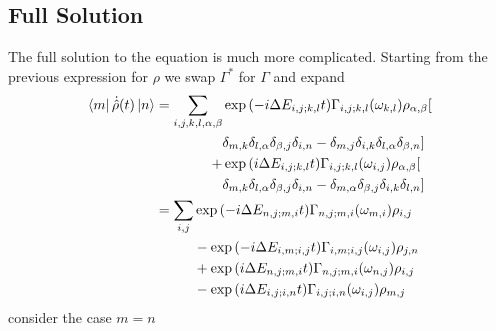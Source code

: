 \subsection{Full Solution}\label{sec:redfield equation full solution}
The full solution to the equation is
much more complicated. Starting from the
previous expression for \(\rho \) we
swap \(\Gamma^*\) for \(\Gamma \) and expand
\begin{align}
    \bra{m}\dot{\hat{\rho}}(t) \ket{n} & = \begin{aligned}[t]
        \sum_{i,j,k, l, \alpha, \beta} &
        \exp{(-i\Delta{}E_{i,j;k,l}t)}
        \Gamma_{i,j;k, l}(\omega_{k,l})
        \rho_{\alpha, \beta} [               \\ &
            \delta_{m, k}\delta_{l, \alpha}
            \delta_{\beta, j}\delta_{i, n}
            -\delta_{m, j}\delta_{i, k}
        \delta_{l, \alpha}\delta_{\beta, n}] \\
        +                              &
        \exp{(i\Delta{}E_{i,j;k,l} t)}
        \Gamma_{i,j; k, l}(\omega_{i,j})
        \rho_{\alpha, \beta} [               \\ &
            \delta_{m, k}\delta_{l, \alpha}
            \delta_{\beta, j}\delta_{i, n}
            - \delta_{m, \alpha}\delta_{\beta, j}
            \delta_{i, k}\delta_{l, n}]
    \end{aligned}                                   \\
                                       & = \begin{aligned}[t]
        \sum_{i,j} &
        \exp{(-i\Delta{}E_{n,j;m,i} t)}
        \Gamma_{n,j;m, i}(\omega_{m,i})
        \rho_{i,j}   \\
                   &
        -\exp{(-i\Delta{}E_{i,m;i,j} t)}
        \Gamma_{i,m;i, j}(\omega_{i,j})
        \rho_{j, n}  \\
                   &
        +\exp{(i\Delta{}E_{n,j;m,i} t)}
        \Gamma_{n,j; m, i}(\omega_{n,j})
        \rho_{i, j}  \\
                   &
        -\exp{(i\Delta{}E_{i,j;i,n} t)}
        \Gamma_{i,j; i, n}(\omega_{i,j})
        \rho_{m, j}
    \end{aligned}\label{eqn:full redfield solution}
\end{align}
consider the case \(m=n\)
